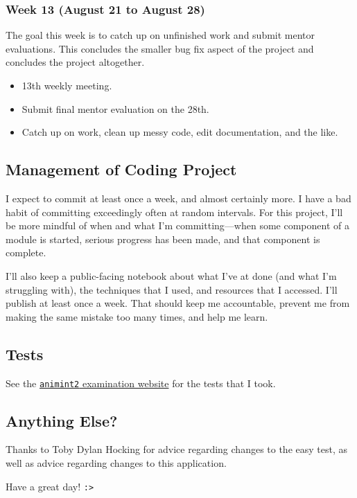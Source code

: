 \documentclass[
]{article}
\providecommand{\tightlist}{%
  \setlength{\itemsep}{0pt}\setlength{\parskip}{0pt}}\usepackage{longtable,booktabs,array}
\begin{document}
\pagebreak

\hypertarget{week-13-august-21-to-august-28}{%
\subsubsection{Week 13 (August 21 to August
28)}\label{week-13-august-21-to-august-28}}

The goal this week is to catch up on unfinished work and submit mentor
evaluations. This concludes the smaller bug fix aspect of the project
and concludes the project altogether.

\begin{itemize}
\tightlist
\item
  13th weekly meeting.
\item
  Submit final mentor evaluation on the 28th.
\item
  Catch up on work, clean up messy code, edit documentation, and the
  like.
\end{itemize}

\hypertarget{management-of-coding-project}{%
\subsection{Management of Coding
Project}\label{management-of-coding-project}}

I expect to commit at least once a week, and almost certainly more. I
have a bad habit of committing exceedingly often at random
intervals. For
this project, I'll be more mindful of when and what I'm
committing---when some component of a module is started, serious
progress has been made, and that component is complete.

I'll also keep a public-facing notebook about what I've at done (and
what I'm struggling with), the techniques that I used, and resources
that I accessed. I'll publish at least once a week. That should keep me
accountable, prevent me from making the same mistake too many times, and
help me learn.

\hypertarget{tests}{%
\subsection{Tests}\label{tests}}

See the \href{https://gsoc.joss.cat}{\texttt{animint2} examination
website} for the tests that I took.

\hypertarget{anything-else}{%
\subsection{Anything Else?}\label{anything-else}}

Thanks to Toby Dylan Hocking for advice regarding changes to the easy
test, as well as advice regarding changes to this application.

Have a great day! \texttt{:\textgreater{}}
\end{document}
